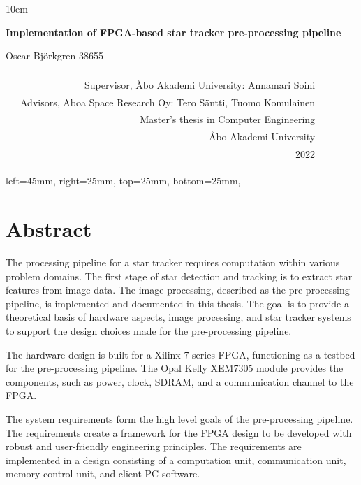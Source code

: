 \documentclass[12pt]{report}
\begin{document}
\emergencystretch 10em
\begin{titlepage}
\begin{center}
        \vspace*{5cm}
        
        \LARGE
        \textbf{Implementation of FPGA-based star tracker pre-processing pipeline}
        \\
        \vspace{0.5cm}
        
        Oscar Björkgren 38655
        
\end{center}
\vspace{8cm}
\begin{tabular}{l r }
\multirow{4}{10em}{
} \\
\multirow{12}{1em}{
} &

Supervisor, Åbo Akademi University: Annamari Soini\\ &
Advisors, Aboa Space Research Oy: Tero Säntti, Tuomo Komulainen\\ & 
Master's thesis in Computer Engineering\\ &
Åbo Akademi University\\ &
2022

\end{tabular}

\flushright
\end{titlepage}
\newgeometry
{
 left=45mm,
 right=25mm,
 top=25mm,
 bottom=25mm,
}
\section*{Abstract}
The processing pipeline for a star tracker requires computation within various problem domains. The first stage of star detection and tracking is to extract star features from image data.
The image processing, described as the pre-processing pipeline, is implemented and documented in this thesis. The goal is to provide a theoretical basis of hardware aspects, image processing, and star tracker systems to support the design choices made for the pre-processing pipeline.

The hardware design is built for a Xilinx 7-series FPGA, functioning as a testbed for the pre-processing pipeline.
The Opal Kelly XEM7305 module provides the components, such as power, clock, SDRAM, and a communication channel to the FPGA.

The system requirements form the high level goals of the pre-processing pipeline. The requirements create a framework for the FPGA design to be developed with robust and user-friendly engineering principles.
The requirements are implemented in a design consisting of a computation unit, communication unit, memory control unit, and client-PC software.
\end{document}
